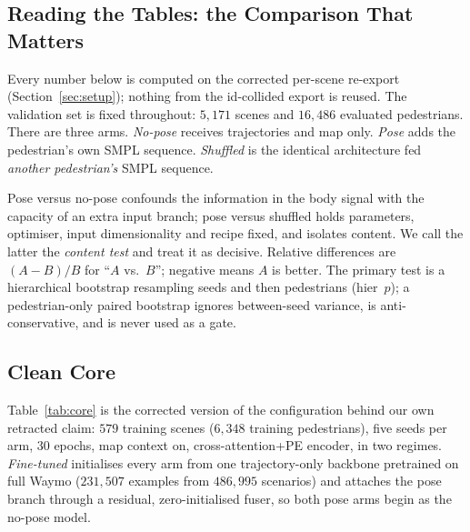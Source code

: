 \documentclass{article} %
\begin{document}
\subsection{Reading the Tables: the Comparison That Matters}
\label{sec:contenttest}

Every number below is computed on the corrected per-scene re-export
(Section~\ref{sec:setup}); nothing from the id-collided export is reused. The
validation set is fixed throughout: $5{,}171$ scenes and $16{,}486$ evaluated
pedestrians. There are three arms. \emph{No-pose} receives trajectories and map
only. \emph{Pose} adds the pedestrian's own SMPL sequence. \emph{Shuffled} is the
identical architecture fed \emph{another pedestrian's} SMPL sequence.

Pose versus no-pose confounds the information in the body signal with the capacity
of an extra input branch; pose versus shuffled holds parameters, optimiser, input
dimensionality and recipe fixed, and isolates content. We call the latter the
\emph{content test} and treat it as decisive. Relative differences are $(A-B)/B$
for ``$A$ vs.\ $B$''; negative means $A$ is better. The primary test is a
hierarchical bootstrap resampling seeds and then pedestrians (hier~$p$); a
pedestrian-only paired bootstrap ignores between-seed variance, is
anti-conservative, and is never used as a gate.

\subsection{Clean Core}
\label{sec:res_core}

Table~\ref{tab:core} is the corrected version of the configuration behind our own
retracted claim: $579$ training scenes ($6{,}348$ training pedestrians), five
seeds per arm, $30$ epochs, map context on, cross-attention+PE encoder, in two
regimes. \emph{Fine-tuned} initialises every arm from one trajectory-only backbone
pretrained on full Waymo ($231{,}507$ examples from $486{,}995$ scenarios) and
attaches the pose branch through a residual, zero-initialised fuser, so both pose
arms begin as the no-pose model.
\end{document}
